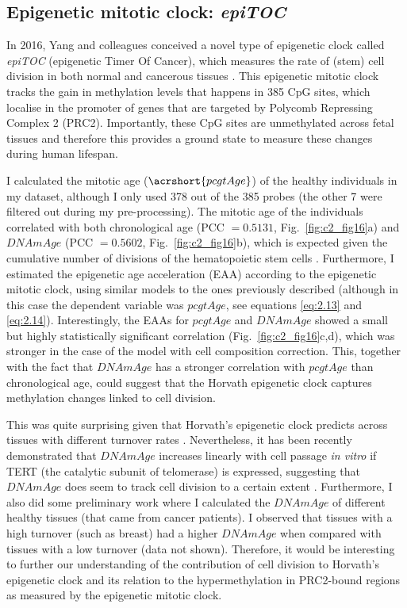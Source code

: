 \subsection{Epigenetic mitotic clock: \textit{epiTOC}}

In 2016, Yang and colleagues conceived a novel type of epigenetic clock called \textit{\acrshort{epiTOC}} (epigenetic Timer Of Cancer), which measures the rate of (stem) cell division in both normal and cancerous tissues \cite{Yang2016}. This epigenetic mitotic clock tracks the gain in methylation levels that happens in 385 CpG sites, which localise in the promoter of genes that are targeted by Polycomb Repressing Complex 2 (\acrshort{PRC2}). Importantly, these CpG sites are unmethylated across fetal tissues and therefore this provides a ground state to measure these changes during human lifespan.

\bigskip

I calculated the mitotic age ($\acrshort{pcgtAge}$) of the healthy individuals in my dataset, although I only used 378 out of the 385 probes (the other 7 were filtered out during my pre-processing). The mitotic age of the individuals correlated with both chronological age (PCC $= 0.5131$, Fig.~\ref{fig:c2_fig16}a) and $DNAmAge$ (PCC $= 0.5602$, Fig.~\ref{fig:c2_fig16}b), which is expected given the cumulative number of divisions of the hematopoietic stem cells \cite{Beerman2013}. Furthermore, I estimated the epigenetic age acceleration (EAA) according to the epigenetic mitotic clock, using similar models to the ones previously described (although in this case the dependent variable was $pcgtAge$, see equations \ref{eq:2.13} and \ref{eq:2.14}). Interestingly, the EAAs for $pcgtAge$ and $DNAmAge$ showed a small but highly statistically significant correlation (Fig.~\ref{fig:c2_fig16}c,d), which was stronger in the case of the model with cell composition correction. This, together with the fact that $DNAmAge$ has a stronger correlation with $pcgtAge$ than chronological age, could suggest that the Horvath epigenetic clock captures methylation changes linked to cell division. 

\bigskip

This was quite surprising given that Horvath's epigenetic clock predicts across tissues with different turnover rates \cite{Yang2016}. Nevertheless, it has been recently demonstrated that $DNAmAge$ increases linearly with cell passage \textit{in vitro} if TERT (the catalytic subunit of telomerase) is expressed, suggesting that $DNAmAge$ does seem to track cell division to a certain extent \cite{Lu2018}. Furthermore, I also did some preliminary work where I calculated the $DNAmAge$ of different healthy tissues (that came from cancer patients). I observed that tissues with a high turnover (such as breast) \cite{Horvath2013,Sehl2017} had a higher $DNAmAge$ when compared with tissues with a low turnover (data not shown). Therefore, it would be interesting to further our understanding of the contribution of cell division to Horvath's epigenetic clock and its relation to the hypermethylation in PRC2-bound regions as measured by the epigenetic mitotic clock.    



